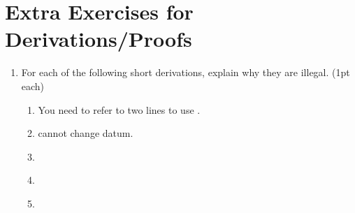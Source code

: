 \section*{Extra Exercises for Derivations/Proofs}

\begin{enumerate}
 \setlength{\itemsep}{2em}

 \item For each of the following short derivations, explain why they are 
  illegal. (1pt each)

  \begin{enumerate}
   \setlength{\itemsep}{1.5em}
 \item 

  \begin{argument*}
  \end{argument*}

  \opts{
  \dotline
  \dotline
  \dotline
 }
 {You need to refer to two lines to use \conjI.
 }
  \item

   \begin{argument*}
   \end{argument*}

   \opts{
  \dotline
  \dotline
 \dotline}
 {
  \conjE{} cannot change datum.
 }

   \item

   \begin{argument*}
   \end{argument*}


  \item 

   \begin{argument*}
   \end{argument*}



   \item

	\begin{argument*}
	\end{argument*}


\end{enumerate}
\end{enumerate}
